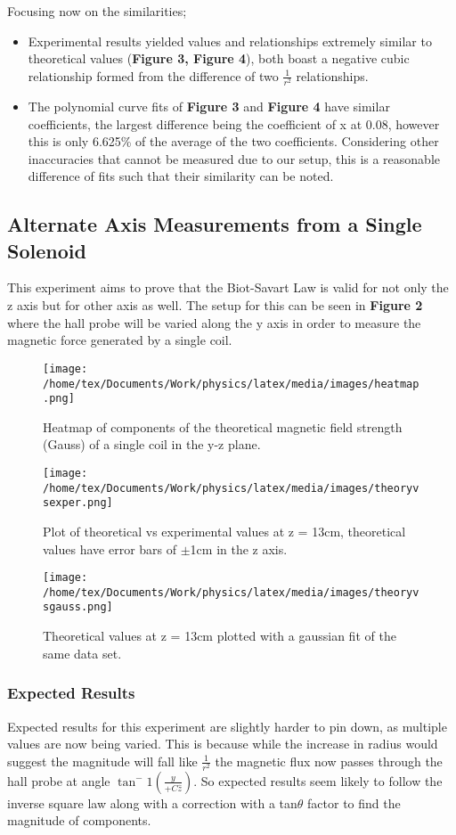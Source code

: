 \documentclass{article}
\begin{document}
   Focusing now on the similarities;
   \begin{itemize}
       \item Experimental results yielded values and relationships extremely similar to theoretical values (\textbf{Figure 3, Figure 4}), both boast a negative cubic relationship 
       formed from the difference of two \(\frac{1}{r^2}\) relationships.
       \item The polynomial curve fits of \textbf{Figure 3} and \textbf{Figure 4} have similar coefficients, the largest difference being the coefficient of x at 0.08, however this is only 6.625\% of the average of the 
       two coefficients. Considering other inaccuracies that cannot be measured due to our setup, this is a reasonable difference of fits such that their similarity can be noted.
   \end{itemize}
   \subsection{Alternate Axis Measurements from a Single Solenoid}
   This experiment aims to prove that the Biot-Savart Law is valid for not only the z axis but for other axis as well. The setup for this can be seen in \textbf{Figure 2}
   where the hall probe will be varied along the y axis in order to measure the magnetic force generated by a single coil.
   \begin{figure}
       \centering
       \texttt{[image: /home/tex/Documents/Work/physics/latex/media/images/heatmap.png]}
       \caption{Heatmap of components of the theoretical magnetic field strength (Gauss) of a single coil in the y-z plane.}
   \end{figure}
   \begin{figure}
        \centering
        \texttt{[image: /home/tex/Documents/Work/physics/latex/media/images/theoryvsexper.png]}
        \caption{Plot of theoretical vs experimental values at z = 13cm, theoretical values have error bars of \(\pm\)1cm in the z axis.}
   \end{figure}
   \begin{figure}
       \centering
       \texttt{[image: /home/tex/Documents/Work/physics/latex/media/images/theoryvsgauss.png]}
       \caption{Theoretical values at z = 13cm plotted with a gaussian fit of the same data set.}
   \end{figure}
   \subsubsection{Expected Results}
   Expected results for this experiment are slightly harder to pin down, as multiple values are now being varied. This is because while the increase in radius would
   suggest the magnitude will fall like \(\frac{1}{r^2}\) the magnetic flux now passes through the hall probe at angle \(\tan^-1(\frac{y}{+C\hat{z}})\). So expected results 
   seem likely to follow the inverse square law along with a correction with a tan\(\theta\) factor to find the magnitude of components.
\end{document}
